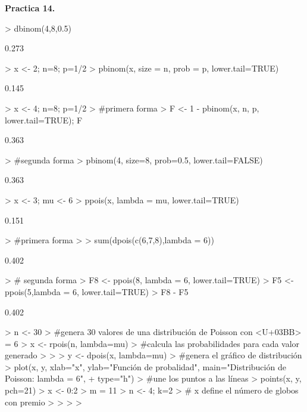 \documentclass{article}
\begin{document}
\textbf{Practica 14.}

\begin{Schunk}
\begin{Sinput}
> dbinom(4,8,0.5)
\end{Sinput}
\begin{Soutput}
[1] 0.273
\end{Soutput}
\begin{Sinput}
> x <- 2; n=8; p=1/2
> pbinom(x, size = n, prob = p, lower.tail=TRUE)
\end{Sinput}
\begin{Soutput}
[1] 0.145
\end{Soutput}
\begin{Sinput}
> x <- 4; n=8; p=1/2
> #primera forma
> F <- 1 - pbinom(x, n, p, lower.tail=TRUE); F
\end{Sinput}
\begin{Soutput}
[1] 0.363
\end{Soutput}
\begin{Sinput}
> #segunda forma
> pbinom(4, size=8, prob=0.5, lower.tail=FALSE)
\end{Sinput}
\begin{Soutput}
[1] 0.363
\end{Soutput}
\begin{Sinput}
> x <- 3; mu <- 6
> ppois(x, lambda = mu, lower.tail=TRUE)
\end{Sinput}
\begin{Soutput}
[1] 0.151
\end{Soutput}
\begin{Sinput}
> #primera forma
> 
> sum(dpois(c(6,7,8),lambda = 6))
\end{Sinput}
\begin{Soutput}
[1] 0.402
\end{Soutput}
\begin{Sinput}
> # segunda forma
> F8 <- ppois(8, lambda = 6, lower.tail=TRUE)
> F5 <- ppois(5,lambda = 6, lower.tail=TRUE)
> F8 - F5
\end{Sinput}
\begin{Soutput}
[1] 0.402
\end{Soutput}
\begin{Sinput}
> n <- 30
> #genera 30 valores de una distribución de Poisson con <U+03BB> = 6
> x <- rpois(n, lambda=mu)
> #calcula las probabilidades para cada valor generado
> 
> 
> y <- dpois(x, lambda=mu)
> #genera el gráfico de distribución
> plot(x, y, xlab="x", ylab="Función de probalidad", main="Distribución de Poisson: lambda = 6",
+ type="h")
> #une los puntos a las líneas
> points(x, y, pch=21)
> x <- 0:2 
> m = 11
> n <- 4; k=2
> # x define el número de globos con premio
> 
> 
> 
> 
\end{Sinput}
\end{Schunk}
\end{document}
